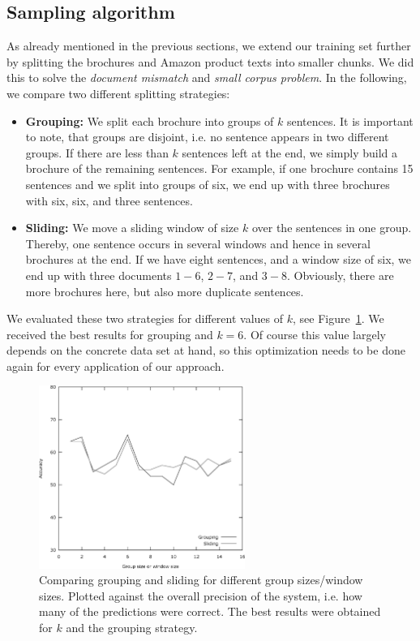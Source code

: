 \subsection{Sampling algorithm}
As already mentioned in the previous sections, we extend our training set further by splitting the brochures and Amazon product texts into smaller chunks.
We did this to solve the \emph{document mismatch} and \emph{small corpus problem}.
In the following, we compare two different splitting strategies:
\begin{itemize}
	\item
		\textbf{Grouping:}
		We split each brochure into groups of $k$ sentences.
		It is important to note, that groups are disjoint, i.e. no sentence appears in two different groups.
		If there are less than $k$ sentences left at the end, we simply build a brochure of the remaining sentences.
		For example, if one brochure contains 15 sentences and we split into groups of six, we end up with three brochures with six, six, and three sentences.
	\item
		\textbf{Sliding:}
		We move a sliding window of size $k$ over the sentences in one group.
		Thereby, one sentence occurs in several windows and hence in several brochures at the end.
		If we have eight sentences, and a window size of six, we end up with three documents $1 - 6$, $2 - 7$, and $3 - 8$.
		Obviously, there are more brochures here, but also more duplicate sentences.
\end{itemize}

We evaluated these two strategies for different values of $k$, see Figure~\ref{fig:sampling_optimization}.
We received the best results for grouping and $k = 6$.
Of course this value largely depends on the concrete data set at hand, so this optimization needs to be done again for every application of our \nto approach.

\begin{figure}
	\begin{center}
		\includegraphics[width=0.6\textwidth]{figures/sampling_optimization.eps}
	\end{center}
	\caption{Comparing grouping and sliding for different group sizes/window sizes. Plotted against the overall precision of the system, i.e. how many of the predictions were correct. The best results were obtained for $k$ and the grouping strategy.}
	\label{fig:sampling_optimization}
\end{figure}
